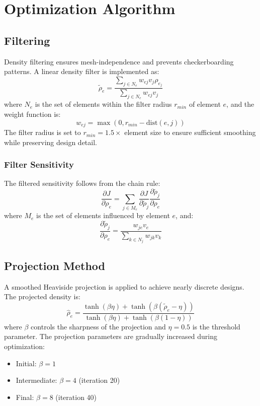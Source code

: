 \documentclass[11pt]{report}
\newcommand{\rhoe}{\rho_e}
\newcommand{\obj}{J}
\begin{document}
\chapter{Optimization Algorithm}

\section{Filtering}
Density filtering ensures mesh-independence and prevents checkerboarding patterns. A linear density filter is implemented as:
\begin{equation}
\tilde{\rho}_e = \frac{\sum_{j \in N_e} w_{ej} v_j \rhoe_j}{\sum_{j \in N_e} w_{ej} v_j}
\end{equation}
where $N_e$ is the set of elements within the filter radius $r_{min}$ of element $e$, and the weight function is:
\begin{equation}
w_{ej} = \max(0, r_{min} - \text{dist}(e,j))
\end{equation}
The filter radius is set to $r_{min} = 1.5 \times$ element size to ensure sufficient smoothing while preserving design detail.

\subsection{Filter Sensitivity}
The filtered sensitivity follows from the chain rule:
\begin{equation}
\frac{\partial \obj}{\partial \rhoe} = \sum_{j \in M_e} \frac{\partial \obj}{\partial \tilde{\rho}_j} \frac{\partial \tilde{\rho}_j}{\partial \rhoe}
\end{equation}
where $M_e$ is the set of elements influenced by element $e$, and:
\begin{equation}
\frac{\partial \tilde{\rho}_j}{\partial \rhoe} = \frac{w_{je} v_e}{\sum_{k \in N_j} w_{jk} v_k}
\end{equation}

\section{Projection Method}
A smoothed Heaviside projection is applied to achieve nearly discrete designs. The projected density is:
\begin{equation}
\hat{\rho}_e = \frac{\tanh(\beta \eta) + \tanh(\beta (\tilde{\rho}_e - \eta))}{\tanh(\beta \eta) + \tanh(\beta (1 - \eta))}
\end{equation}
where $\beta$ controls the sharpness of the projection and $\eta = 0.5$ is the threshold parameter. The projection parameters are gradually increased during optimization:
\begin{itemize}
    \item Initial: $\beta = 1$
    \item Intermediate: $\beta = 4$ (iteration 20)
    \item Final: $\beta = 8$ (iteration 40)
\end{itemize}
\end{document}
